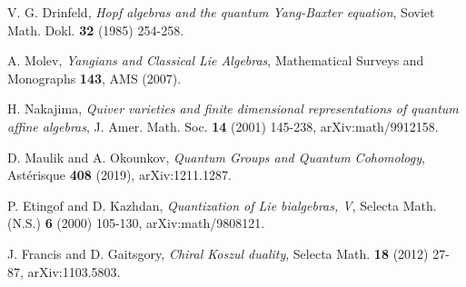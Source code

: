 \begin{thebibliography}{99}

V. G. Drinfeld, \emph{Hopf algebras and the quantum Yang-Baxter equation}, 
Soviet Math. Dokl. \textbf{32} (1985) 254-258.

A. Molev, \emph{Yangians and Classical Lie Algebras}, 
Mathematical Surveys and Monographs \textbf{143}, AMS (2007).

H. Nakajima, \emph{Quiver varieties and finite dimensional representations of 
quantum affine algebras}, 
J. Amer. Math. Soc. \textbf{14} (2001) 145-238, arXiv:math/9912158.

D. Maulik and A. Okounkov, \emph{Quantum Groups and Quantum Cohomology}, 
Astérisque \textbf{408} (2019), arXiv:1211.1287.


P. Etingof and D. Kazhdan, \emph{Quantization of Lie bialgebras, V}, 
Selecta Math. (N.S.) \textbf{6} (2000) 105-130, arXiv:math/9808121.

J. Francis and D. Gaitsgory, \emph{Chiral Koszul duality}, 
Selecta Math. \textbf{18} (2012) 27-87, arXiv:1103.5803.
 
\end{thebibliography}